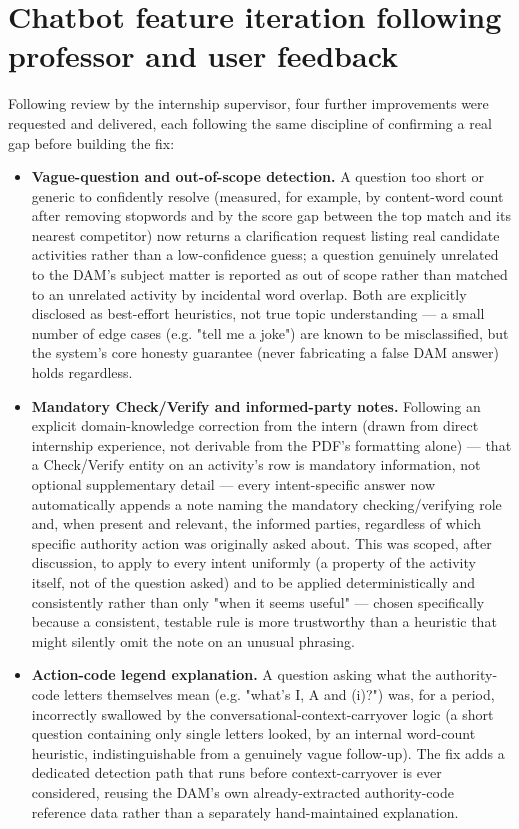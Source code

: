 \section{Chatbot feature iteration following professor and user feedback}
Following review by the internship supervisor, four further improvements were requested and delivered, each following the same discipline of confirming a real gap before building the fix:

\begin{itemize}
\item \textbf{Vague-question and out-of-scope detection.} A question too short or generic to confidently resolve (measured, for example, by content-word count after removing stopwords and by the score gap between the top match and its nearest competitor) now returns a clarification request listing real candidate activities rather than a low-confidence guess; a question genuinely unrelated to the DAM's subject matter is reported as out of scope rather than matched to an unrelated activity by incidental word overlap. Both are explicitly disclosed as best-effort heuristics, not true topic understanding — a small number of edge cases (e.g. "tell me a joke") are known to be misclassified, but the system's core honesty guarantee (never fabricating a false DAM answer) holds regardless.
\item \textbf{Mandatory Check/Verify and informed-party notes.} Following an explicit domain-knowledge correction from the intern (drawn from direct internship experience, not derivable from the PDF's formatting alone) — that a Check/Verify entity on an activity's row is mandatory information, not optional supplementary detail — every intent-specific answer now automatically appends a note naming the mandatory checking/verifying role and, when present and relevant, the informed parties, regardless of which specific authority action was originally asked about. This was scoped, after discussion, to apply to every intent uniformly (a property of the activity itself, not of the question asked) and to be applied deterministically and consistently rather than only "when it seems useful" — chosen specifically because a consistent, testable rule is more trustworthy than a heuristic that might silently omit the note on an unusual phrasing.
\item \textbf{Action-code legend explanation.} A question asking what the authority-code letters themselves mean (e.g. "what's I, A and (i)?") was, for a period, incorrectly swallowed by the conversational-context-carryover logic (a short question containing only single letters looked, by an internal word-count heuristic, indistinguishable from a genuinely vague follow-up). The fix adds a dedicated detection path that runs before context-carryover is ever considered, reusing the DAM's own already-extracted authority-code reference data rather than a separately hand-maintained explanation.

\end{itemize}
